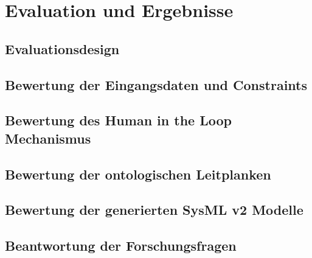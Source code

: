 \section{Evaluation und Ergebnisse}
\subsection{Evaluationsdesign}
\subsection{Bewertung der Eingangsdaten und Constraints}
\subsection{Bewertung des Human in the Loop Mechanismus}
\subsection{Bewertung der ontologischen Leitplanken}
\subsection{Bewertung der generierten SysML v2 Modelle}
\subsection{Beantwortung der Forschungsfragen}
